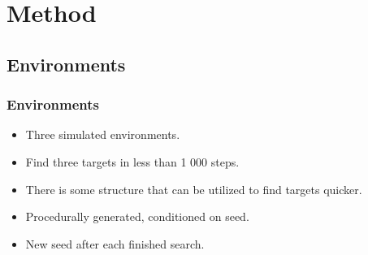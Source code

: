 \section{Method}

\subsection{Environments}

\begin{frame}
    \frametitle{Environments}
    
    \begin{itemize}
        \item Three simulated environments.
        \item Find three targets in less than 1 000 steps.
        \item There is some structure that can be utilized to find targets quicker.
        \item Procedurally generated, conditioned on seed.
        \item New seed after each finished search.
    \end{itemize}
\end{frame}

